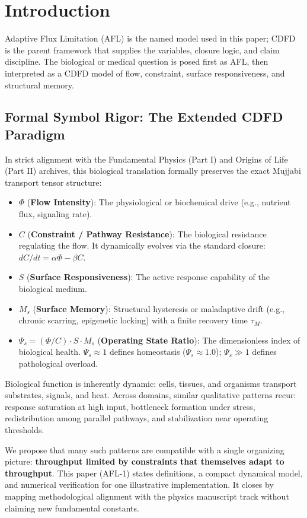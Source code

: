 \documentclass[11pt]{article}
\begin{document}
\section{Introduction}

Adaptive Flux Limitation (AFL) is the named model used in this paper; CDFD is the parent framework that supplies the variables, closure logic, and claim discipline. The biological or medical question is posed first as AFL, then interpreted as a CDFD model of flow, constraint, surface responsiveness, and structural memory.

\subsection{Formal Symbol Rigor: The Extended CDFD Paradigm}
In strict alignment with the Fundamental Physics (Part I) and Origins of Life (Part II) archives, this biological translation formally preserves the exact Mujjabi transport tensor structure:
\begin{itemize}
    \item $\Phi$ (\textbf{Flow Intensity}): The physiological or biochemical drive (e.g., nutrient flux, signaling rate).
    \item $C$ (\textbf{Constraint / Pathway Resistance}): The biological resistance regulating the flow. It dynamically evolves via the standard closure: $dC/dt = \alpha \Phi - \beta C$.
    \item $S$ (\textbf{Surface Responsiveness}): The active response capability of the biological medium.
    \item $M_s$ (\textbf{Surface Memory}): Structural hysteresis or maladaptive drift (e.g., chronic scarring, epigenetic locking) with a finite recovery time $\tau_M$.
    \item $\Psi_s = (\Phi/C) \cdot S \cdot M_s$ (\textbf{Operating State Ratio}): The dimensionless index of biological health. $\Psi_s \approx 1$ defines homeostasis ($\Psi_s \approx 1.0$); $\Psi_s \gg 1$ defines pathological overload.
\end{itemize}

Biological function is inherently dynamic: cells, tissues, and organisms transport substrates, signals, and heat. Across domains, similar qualitative patterns recur: response saturation at high input, bottleneck formation under stress, redistribution among parallel pathways, and stabilization near operating thresholds.

We propose that many such patterns are compatible with a single organizing picture: \textbf{throughput limited by constraints that themselves adapt to throughput}. This paper (AFL-1) states definitions, a compact dynamical model, and numerical verification for one illustrative implementation. It closes by mapping methodological alignment with the physics manuscript track without claiming new fundamental constants.
\end{document}
